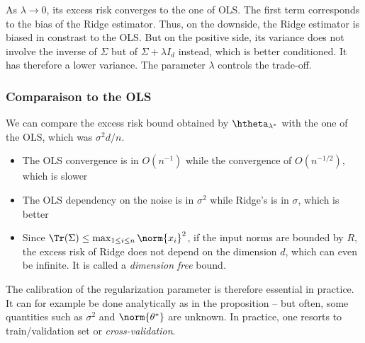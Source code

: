 \documentclass{../cs-classes/cs-classes}
\begin{document}
\begin{remark}
    As $\lambda\to0$, its excess risk converges to the one of OLS. The first term corresponds to the bias of the Ridge estimator. Thus, on the downside, the Ridge estimator is biased in constrast to the OLS. But on the positive side, its variance does not involve the inverse of $\Sigma$ but of $\Sigma+\lambda I_d$ instead, which is better conditioned. It has therefore a lower variance. The parameter $\lambda$ controls the trade-off.
\end{remark}

\subsubsection{Comparaison to the OLS}
We can compare the excess risk bound obtained by $\htheta_{\lambda^*}$ with the one of the OLS, which was $\sigma^2d/n$.
\begin{itemize}
    \item The OLS convergence is in $O(n^{-1})$ while the convergence of $O(n^{-1/2})$, which is slower
    \item The OLS dependency on the noise is in $\sigma^2$ while Ridge's is in $\sigma$, which is better
    \item Since $\Tr(\Sigma)\leq\max_{1\leq i\leq n}\norm{x_i}^2$, if the input norms are bounded by $R$, the excess risk of Ridge does not depend on the dimension $d$, which can even be infinite. It is called a \emph{dimension free} bound.
\end{itemize}
The calibration of the regularization parameter is therefore essential in practice. It can for example be done analytically as in the proposition -- but often, some quantities such as $\sigma^2$ and $\norm{\theta^*}$ are unknown. In practice, one resorts to train/validation set or \emph{cross-validation}.
\end{document}
